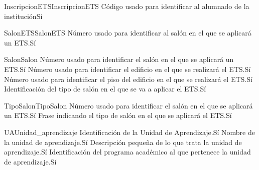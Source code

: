 \begin{cdtEntidad}{InscripcionETS}{InscripcionETS}
	{Código usado para identificar al alumnado de la institución}{Sí}
\end{cdtEntidad}
\begin{cdtEntidad}{SalonETS}{SalonETS}
	{Número usado para identificar al salón en el que se aplicará un ETS.}{Sí}
\end{cdtEntidad}
\begin{cdtEntidad}{Salon}{Salon}
	{Número usado para identificar el salón en el que se aplicará un ETS.}{Sí}
	{Número usado para identificar el edificio en el que se realizará el ETS.}{Sí}
	{Número usado para identificar el piso del edificio en el que se realizará el ETS.}{Sí}
	{Identificación del tipo de salón en el que se va a aplicar el ETS.}{Sí}
\end{cdtEntidad}
\begin{cdtEntidad}{TipoSalon}{TipoSalon}
	{Número usado para identificar el salón en el que se aplicará un ETS.}{Sí}
	{Frase indicando el tipo de salón en el que se aplicará el ETS.}{Sí}
\end{cdtEntidad}
\begin{cdtEntidad}{UA}{Unidad\_aprendizaje}
	{Identificación de la Unidad de Aprendizaje.}{Sí}
	{Nombre de la unidad de aprendizaje.}{Sí}
	{Descripción pequeña de lo que trata la unidad de aprendizaje.}{Sí}
	{Identificación del programa académico al que pertenece la unidad de aprendizaje.}{Sí}
\end{cdtEntidad}
